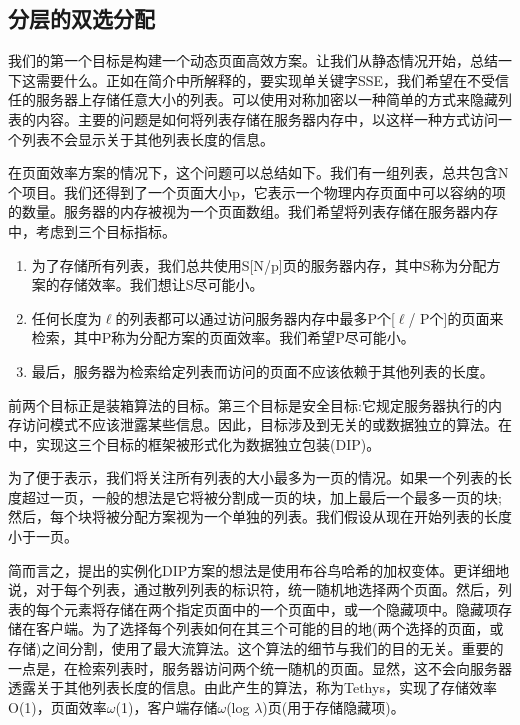 \documentclass[UTF8]{article}
\begin{document}
\subsection{分层的双选分配}
我们的第一个目标是构建一个动态页面高效方案。让我们从静态情况开始，总结一下这需要什么。正如在简介中所解释的，要实现单关键字SSE，我们希望在不受信任的服务器上存储任意大小的列表。可以使用对称加密以一种简单的方式来隐藏列表的内容。主要的问题是如何将列表存储在服务器内存中，以这样一种方式访问一个列表不会显示关于其他列表长度的信息。

在页面效率方案的情况下，这个问题可以总结如下。我们有一组列表，总共包含N个项目。我们还得到了一个页面大小p，它表示一个物理内存页面中可以容纳的项的数量。服务器的内存被视为一个页面数组。我们希望将列表存储在服务器内存中，考虑到三个目标指标。

\begin{enumerate}
  \item 为了存储所有列表，我们总共使用S[N/p]页的服务器内存，其中S称为分配方案的存储效率。我们想让S尽可能小。
  \item 任何长度为$\ell$的列表都可以通过访问服务器内存中最多P个[$\ell$/ P个]的页面来检索，其中P称为分配方案的页面效率。我们希望P尽可能小。
  \item 最后，服务器为检索给定列表而访问的页面不应该依赖于其他列表的长度。
\end{enumerate}

前两个目标正是装箱算法的目标。第三个目标是安全目标:它规定服务器执行的内存访问模式不应该泄露某些信息。因此，目标涉及到无关的或数据独立的算法。在\cite{AngleBossuat2021SSEAS}中，实现这三个目标的框架被形式化为数据独立包装(DIP)。

为了便于表示，我们将关注所有列表的大小最多为一页的情况。如果一个列表的长度超过一页，一般的想法是它将被分割成一页的块，加上最后一个最多一页的块;然后，每个块将被分配方案视为一个单独的列表。我们假设从现在开始列表的长度小于一页。

简而言之，\cite{AngleBossuat2021SSEAS}提出的实例化DIP方案的想法是使用布谷鸟哈希的加权变体。更详细地说，对于每个列表，通过散列列表的标识符，统一随机地选择两个页面。然后，列表的每个元素将存储在两个指定页面中的一个页面中，或一个隐藏项中。隐藏项存储在客户端。为了选择每个列表如何在其三个可能的目的地(两个选择的页面，或存储)之间分割，\cite{AngleBossuat2021SSEAS}使用了最大流算法。这个算法的细节与我们的目的无关。重要的一点是，在检索列表时，服务器访问两个统一随机的页面。显然，这不会向服务器透露关于其他列表长度的信息。由此产生的算法，称为Tethys，实现了存储效率O(1)，页面效率$\omega$(1)，客户端存储$\omega$(log $\lambda$)页(用于存储隐藏项)。
\end{document}
